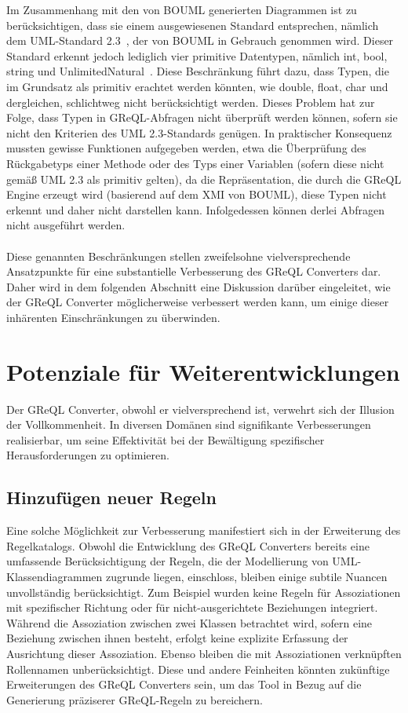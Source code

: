 Im Zusammenhang mit den von BOUML generierten Diagrammen ist zu berücksichtigen, dass sie einem ausgewiesenen Standard
entsprechen, nämlich dem UML-Standard 2.3~\cite{OMG_UML_23_Infrastructure}, der von BOUML in Gebrauch genommen wird.
Dieser Standard erkennt jedoch lediglich vier primitive Datentypen, nämlich int, bool, string und
UnlimitedNatural~\cite{OMG_UML_23_Infrastructure}. Diese Beschränkung führt dazu, dass Typen, die im Grundsatz als
primitiv erachtet werden könnten, wie double, float, char und dergleichen, schlichtweg nicht berücksichtigt werden.
Dieses Problem hat zur Folge, dass Typen in GReQL-Abfragen nicht überprüft werden können, sofern sie nicht den Kriterien
des UML 2.3-Standards genügen. In praktischer Konsequenz mussten gewisse Funktionen aufgegeben werden, etwa die
Überprüfung des Rückgabetyps einer Methode oder des Typs einer Variablen (sofern diese nicht gemäß UML 2.3 als primitiv
gelten), da die Repräsentation, die durch die GReQL Engine erzeugt wird (basierend auf dem XMI von BOUML), diese Typen
nicht erkennt und daher nicht darstellen kann. Infolgedessen können derlei Abfragen nicht ausgeführt werden.
\\~\\
Diese genannten Beschränkungen stellen zweifelsohne vielversprechende Ansatzpunkte für eine substantielle Verbesserung
des GReQL Converters dar. Daher wird in dem folgenden Abschnitt eine Diskussion darüber eingeleitet, wie der GReQL
Converter möglicherweise verbessert werden kann, um einige dieser inhärenten Einschränkungen zu überwinden.


\section{Potenziale für Weiterentwicklungen}

Der GReQL Converter, obwohl er vielversprechend ist, verwehrt sich der Illusion der Vollkommenheit. In diversen Domänen
sind signifikante Verbesserungen realisierbar, um seine Effektivität bei der Bewältigung spezifischer Herausforderungen
zu optimieren.

\subsection{Hinzufügen neuer Regeln}

Eine solche Möglichkeit zur Verbesserung manifestiert sich in der Erweiterung des Regelkatalogs. Obwohl die Entwicklung
des GReQL Converters bereits eine umfassende Berücksichtigung der Regeln, die der Modellierung von UML-Klassendiagrammen
zugrunde liegen, einschloss, bleiben einige subtile Nuancen unvollständig berücksichtigt. Zum Beispiel wurden keine
Regeln für Assoziationen mit spezifischer Richtung oder für nicht-ausgerichtete Beziehungen integriert. Während die
Assoziation zwischen zwei Klassen betrachtet wird, sofern eine Beziehung zwischen ihnen besteht, erfolgt keine explizite
Erfassung der Ausrichtung dieser Assoziation. Ebenso bleiben die mit Assoziationen verknüpften Rollennamen
unberücksichtigt. Diese und andere Feinheiten könnten zukünftige Erweiterungen des GReQL Converters sein, um das Tool
in Bezug auf die Generierung präziserer GReQL-Regeln zu bereichern.

